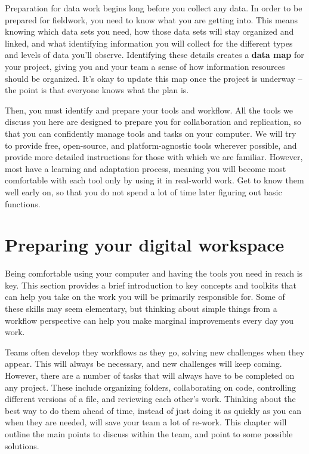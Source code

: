 
\begin{fullwidth}
Preparation for data work begins long before you collect any data.
In order to be prepared for fieldwork, you need to know what you are getting into.
This means knowing which data sets you need,
how those data sets will stay organized and linked,
and what identifying information you will collect
for the different types and levels of data you'll observe.
Identifying these details creates a \textbf{data map} for your project,
giving you and your team a sense of how information resources should be organized.
It's okay to update this map once the project is underway --
the point is that everyone knows what the plan is.

Then, you must identify and prepare your tools and workflow.
All the tools we discuss you here are designed to prepare you for collaboration and replication,
so that you can confidently manage tools and tasks on your computer.
We will try to provide free, open-source, and platform-agnostic tools wherever possible,
and provide more detailed instructions for those with which we are familiar.
However, most have a learning and adaptation process,
meaning you will become most comfortable with each tool
only by using it in real-world work.
Get to know them well early on,
so that you do not spend a lot of time later figuring out basic functions.
\end{fullwidth}



\section{Preparing your digital workspace}

Being comfortable using your computer and having the tools you need in reach is key.
This section provides a brief introduction to key concepts and toolkits
that can help you take on the work you will be primarily responsible for.
Some of these skills may seem elementary,
but thinking about simple things from a workflow perspective
can help you make marginal improvements every day you work.

Teams often develop they workflows as they go,
solving new challenges when they appear.
This will always be necessary,
and new challenges will keep coming.
However, there are a number of tasks that will always have to be completed on any project.
These include organizing folders,
collaborating on code,
controlling different versions of a file,
and reviewing each other's work.
Thinking about the best way to do them ahead of time,
instead of just doing it as quickly as you can when they are needed,
will save your team a lot of re-work.
This chapter will outline the main points to discuss within the team,
and point to some possible solutions. 

